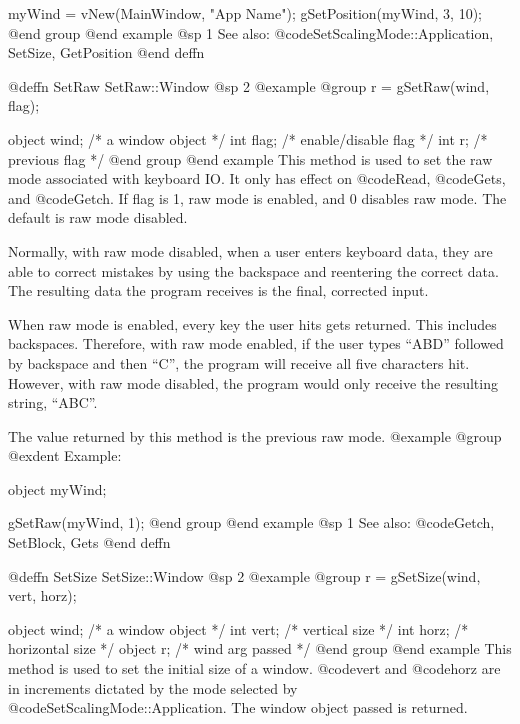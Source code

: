 myWind = vNew(MainWindow, "App Name");
gSetPosition(myWind, 3, 10);
@end group
@end example
@sp 1
See also:  @code{SetScalingMode::Application, SetSize, GetPosition}
@end deffn











@deffn {SetRaw} SetRaw::Window
@sp 2
@example
@group
r = gSetRaw(wind, flag);

object  wind;   /*  a window object     */
int     flag;   /*  enable/disable flag */
int     r;      /*  previous flag       */
@end group
@end example
This method is used to set the raw mode associated with keyboard
IO.  It only has effect on @code{Read}, @code{Gets}, and @code{Getch}.
If flag is 1, raw mode is enabled, and 0 disables raw mode.  The
default is raw mode disabled.

Normally, with raw mode disabled, when a user enters keyboard data,
they are able to correct mistakes by using the backspace and reentering
the correct data.  The resulting data the program receives is the
final, corrected input.

When raw mode is enabled, every key the user hits gets returned.  This
includes backspaces.  Therefore, with raw mode enabled, if the user types
``ABD'' followed by backspace and then ``C'', the program will receive all
five characters hit.  However, with raw mode disabled, the program would
only receive the resulting string, ``ABC''.

The value returned by this method is the previous raw mode.
@example
@group
@exdent Example:

object  myWind;

gSetRaw(myWind, 1);
@end group
@end example
@sp 1
See also:  @code{Getch, SetBlock, Gets}
@end deffn











@deffn {SetSize} SetSize::Window
@sp 2
@example
@group
r = gSetSize(wind, vert, horz);

object  wind;   /*  a window object     */
int     vert;   /*  vertical size       */
int     horz;   /*  horizontal size     */
object  r;      /*  wind arg passed     */
@end group
@end example
This method is used to set the initial size of a window.
@code{vert} and @code{horz} are in increments dictated by the
mode selected by @code{SetScalingMode::Application}.  The window
object passed is returned.

